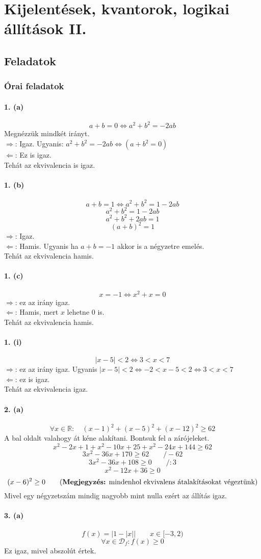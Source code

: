 \documentclass[12pt,a4paper,fleqn]{article}
\newcommand{\myparagraph}[1]{\paragraph{#1}\mbox{}}
\begin{document}
\clearpage
\section{Kijelentések, kvantorok, logikai állítások II.}
\setcounter{subsection}{1}
\subsection{Feladatok}
\subsubsection{Órai feladatok}

\myparagraph{1. (a)}
\[ a + b = 0 \iff a^2 + b^2 = -2ab \]
Megnézzük mindkét irányt. \\
$\Rightarrow$: Igaz. Ugyanis: $a^2 + b^2 = -2ab \iff (a+b^2 = 0)$ \\
$\Leftarrow$: Ez is igaz. \\
Tehát az ekvivalencia is igaz.

\myparagraph{1. (b)}
\[ a + b = 1 \iff a^2 + b^2 = 1 - 2ab \]
\[ a^2 + b^2 = 1 - 2ab \]
\[ a^2 + b^2 + 2ab = 1 \]
\[ (a+b)^2 = 1 \]
$\Rightarrow$: Igaz. \\
$\Leftarrow$: Hamis. Ugyanis ha $a+b=-1$ akkor is a négyzetre emelés. \\
Tehát az ekvivalencia hamis.

\myparagraph{1. (c)}
\[ x = -1 \iff x^2 + x = 0 \]
$\Rightarrow$: ez az irány igaz. \\
$\Leftarrow$: Hamis, mert $x$ lehetne $0$ is. \\
Tehát az ekvivalencia hamis.

\myparagraph{1. (i)}
\[ |x-5| < 2 \iff 3 < x < 7 \]
$\Rightarrow$: ez az irány igaz. Ugyanis $|x-5| < 2 \iff -2 < x-5 < 2
  \iff 3 < x < 7 $ \\
$\Leftarrow$: ez is igaz. \\
Tehát az ekvivalencia igaz.

\myparagraph{2. (a)}
\[ \forall x \in \mathbb{R}: \quad (x-1)^2+(x-5)^2+(x-12)^2 \geq 62 \]
A bal oldalt valahogy át kéne alakítani. Bontsuk fel a zárójeleket.
\[ x^2-2x+1+x^2-10x+25+x^2-24x+144 \geq 62 \]
\[ 3x^2 - 36x + 170 \geq 62 \qquad /-62 \]
\[ 3x^2 - 36x + 108 \geq 0  \qquad /:3  \]
\[  x^2 - 12x + 36  \geq 0 \]
\[ (x-6)^2 \geq 0 \qquad \text{(\textbf{Megjegyzés:} mindenhol ekvivalens
  átalakításokat végeztünk)}\]
Mivel egy négyzetszám mindig nagyobb mint nulla ezért az állítás igaz.

\myparagraph{3. (a)}
\[ f(x) = \big|1-|x|\big| \qquad x \in [-3, 2) \]
\[ \forall x \in \mathcal{D}_f: f(x) \geq 0 \]
Ez igaz, mivel abszolút értek.
\end{document}

